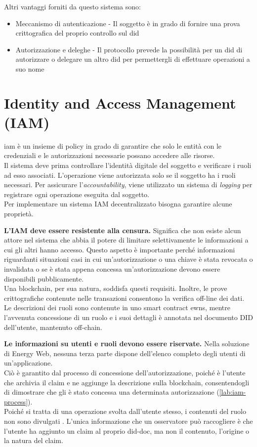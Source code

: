 Altri vantaggi forniti da questo sistema sono:
\begin{itemize}
    \item Meccanismo di autenticazione - Il soggetto è in grado di fornire una prova crittografica del proprio controllo sul \gls{did}
    \item Autorizzazione e deleghe -  Il protocollo prevede la possibilità per un \gls{did} di autorizzare o delegare un altro \gls{did} per permettergli di effettuare operazioni a suo nome
\end{itemize}

\section{Identity and Access Management (IAM)}
\label{sec:iam}

\gls{iam} è un insieme di policy in grado di garantire che solo le entità con le credenziali e le autorizzazioni necessarie possano accedere alle risorse. \\
Il sistema deve prima controllare l'identità digitale del soggetto e verificare i ruoli ad esso associati.
L'operazione viene autorizzata solo se il soggetto ha i ruoli necessari.
Per assicurare l'\textit{accountability}, viene utilizzato un sistema di \textit{logging} per registrare ogni operazione eseguita dal soggetto.\\

Per implementare un sistema IAM decentralizzato bisogna garantire alcune proprietà. 

\textbf{L'IAM deve essere resistente alla censura.}
Significa che non esiste alcun attore nel sistema che abbia il potere di limitare selettivamente le informazioni a cui gli altri hanno accesso.
Questo aspetto è importante perché informazioni riguardanti situazioni casi in cui un'autorizzazione o una chiave è stata revocata o invalidata o se è stata appena concessa un'autorizzazione devono essere disponibili pubblicamente. \\
Una blockchain, per sua natura, soddisfa questi requisiti. Inoltre, le prove crittografiche contenute nelle transazioni consentono la verifica off-line dei dati.
Le descrizioni dei ruoli sono contenute in uno smart contract \gls{ewns}, mentre l'avvenuta concessione di un ruolo e i suoi dettagli è annotata nel documento DID dell'utente, mantenuto off-chain.

\textbf{Le informazioni su utenti e ruoli devono essere riservate.}
Nella soluzione di Energy Web, nessuna terza parte dispone dell'elenco completo degli utenti di un'applicazione. \\
Ciò è garantito dal processo di concessione dell'autorizzazione, poiché è l'utente che archivia il claim e ne aggiunge la descrizione sulla blockchain, consentendogli di dimostrare che gli è stato concessa una determinata autorizzazione (\autoref{lab:iam-process}). \\
Poiché si tratta di una operazione svolta dall'utente stesso, i contenuti del ruolo non sono divulgati \cite{img:iam}.
L'unica informazione che un osservatore può raccogliere è che l'utente ha aggiunto un claim al proprio \gls{did-doc}, ma non il contenuto, l'origine o la natura del claim. \\

